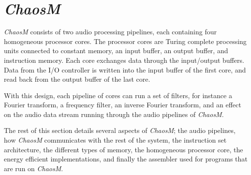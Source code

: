 
\FloatBarrier
\section{\textit{ChaosM}}\label{chapter:fpga}

\textit{ChaosM} consists of two audio processing pipelines, each containing four
homogeneous processor cores. The processor cores are Turing complete processing
units connected to constant memory, an input buffer, an output buffer, and
instruction memory. Each core exchanges data through the input/output buffers.
Data from the I/O controller is written into the input buffer of the first core,
and read back from the output buffer of the last core.

With this design, each pipeline of cores can run a set of filters, for instance
a Fourier transform, a frequency filter, an inverse Fourier transform, and an
effect on the audio data stream running through the audio pipelines of
\textit{ChaosM}.

The rest of this section details several aspects of \textit{ChaosM}; the audio
pipelines, how \textit{ChaosM} communicates with the rest of the system, the
instruction set architecture, the different types of memory, the homogeneous
processor core, the energy efficient implementations, and finally the assembler
used for programs that are run on \textit{ChaosM}.








